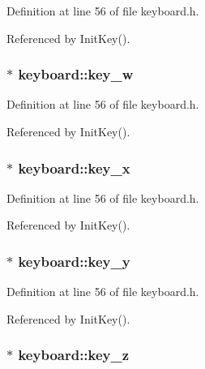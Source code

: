Definition at line 56 of file keyboard.h.

Referenced by Init\-Key().
\subsubsection{ $\ast$ {\bf keyboard::key\_\-w}\hspace{0.3cm}{\tt  [private]}}\label{classkeyboard_keyboardr22}




Definition at line 56 of file keyboard.h.

Referenced by Init\-Key().
\subsubsection{ $\ast$ {\bf keyboard::key\_\-x}\hspace{0.3cm}{\tt  [private]}}\label{classkeyboard_keyboardr23}




Definition at line 56 of file keyboard.h.

Referenced by Init\-Key().
\subsubsection{ $\ast$ {\bf keyboard::key\_\-y}\hspace{0.3cm}{\tt  [private]}}\label{classkeyboard_keyboardr24}




Definition at line 56 of file keyboard.h.

Referenced by Init\-Key().
\subsubsection{ $\ast$ {\bf keyboard::key\_\-z}\hspace{0.3cm}{\tt  [private]}}\label{classkeyboard_keyboardr25}




